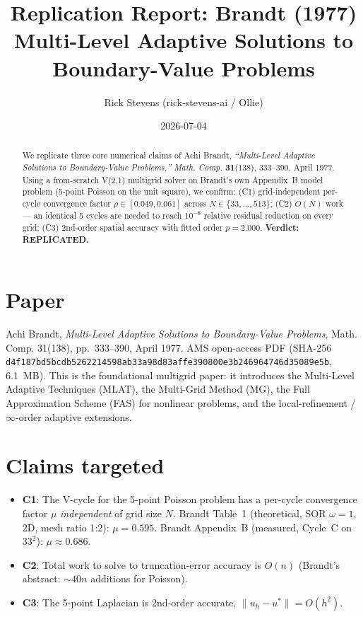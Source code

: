 \documentclass[11pt]{article}
\title{Replication Report: Brandt (1977) Multi-Level Adaptive Solutions to Boundary-Value Problems}
\author{Rick Stevens (rick-stevens-ai / Ollie)}
\date{2026-07-04}
\begin{document}
\maketitle

\begin{abstract}
We replicate three core numerical claims of Achi Brandt, \emph{``Multi-Level Adaptive Solutions to Boundary-Value Problems,''} \emph{Math. Comp.} \textbf{31}(138), 333--390, April 1977. Using a from-scratch V(2,1) multigrid solver on Brandt's own Appendix~B model problem (5-point Poisson on the unit square), we confirm: (C1) grid-independent per-cycle convergence factor $\rho \in [0.049, 0.061]$ across $N \in \{33, \dots, 513\}$; (C2) $O(N)$ work --- an identical 5 cycles are needed to reach $10^{-6}$ relative residual reduction on every grid; (C3) 2nd-order spatial accuracy with fitted order $p = 2.000$. \textbf{Verdict: REPLICATED.}
\end{abstract}

\section{Paper}
Achi Brandt, \emph{Multi-Level Adaptive Solutions to Boundary-Value Problems}, Math. Comp. 31(138), pp.~333--390, April 1977. AMS open-access PDF (SHA-256 \texttt{d4f187bd5bcdb5262214598ab33a98d83affe390800e3b246964746d35089e5b}, 6.1~MB). This is the foundational multigrid paper: it introduces the Multi-Level Adaptive Techniques (MLAT), the Multi-Grid Method (MG), the Full Approximation Scheme (FAS) for nonlinear problems, and the local-refinement / $\infty$-order adaptive extensions.

\section{Claims targeted}
\begin{itemize}
\item \textbf{C1}: The V-cycle for the 5-point Poisson problem has a per-cycle convergence factor $\mu$ \emph{independent} of grid size $N$. Brandt Table~1 (theoretical, SOR $\omega=1$, 2D, mesh ratio 1{:}2): $\mu = 0.595$. Brandt Appendix~B (measured, Cycle~C on $33^2$): $\mu \approx 0.686$.
\item \textbf{C2}: Total work to solve to truncation-error accuracy is $O(n)$ (Brandt's abstract: $\sim 40n$ additions for Poisson).
\item \textbf{C3}: The 5-point Laplacian is 2nd-order accurate, $\|u_h - u^*\| = O(h^2)$.
\end{itemize}
\end{document}
